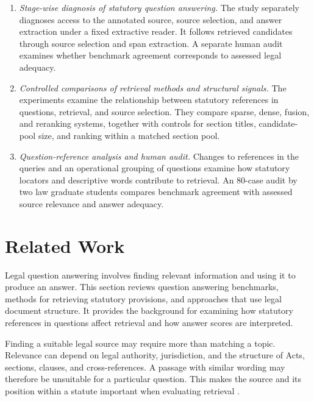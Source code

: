 \documentclass[pdflatex,sn-basic]{sn-jnl}%
\theoremstyle{thmstyleone}%
\theoremstyle{thmstyletwo}%
\theoremstyle{thmstylethree}%
\begin{document}
\begin{enumerate}
    \item \emph{Stage-wise diagnosis of statutory question answering.} The
    study separately diagnoses access to the annotated source, source selection,
    and answer extraction under a fixed extractive reader. It follows retrieved
    candidates through source selection and span extraction. A separate human
    audit examines whether benchmark agreement corresponds to assessed legal
    adequacy.

    \item \emph{Controlled comparisons of retrieval methods and structural
    signals.} The experiments examine the relationship between statutory
    references in questions, retrieval, and source selection. They compare
    sparse, dense, fusion, and reranking systems, together with controls for
    section titles, candidate-pool size, and ranking within a matched section
    pool.

    \item \emph{Question-reference analysis and human audit.} Changes to
    references in the queries and an operational grouping of questions examine
    how statutory locators and descriptive words contribute to retrieval. An
    80-case audit by two law graduate students compares benchmark agreement with
    assessed source relevance and answer adequacy.
\end{enumerate}


\section{Related Work}\label{sec:related}

Legal question answering involves finding relevant information and using it to
produce an answer. This section reviews question answering benchmarks, methods
for retrieving statutory provisions, and approaches that use legal document
structure. It provides the background for examining how statutory references
in questions affect retrieval and how answer scores are interpreted.

Finding a suitable legal source may require more than matching a topic.
Relevance can depend on legal authority, jurisdiction, and the structure of
Acts, sections, clauses, and cross-references. A passage with similar wording
may therefore be unsuitable for a particular question. This makes the source
and its position within a statute important when evaluating retrieval
\citep{van2017concept,vsavelka2022legal}.
\end{document}
